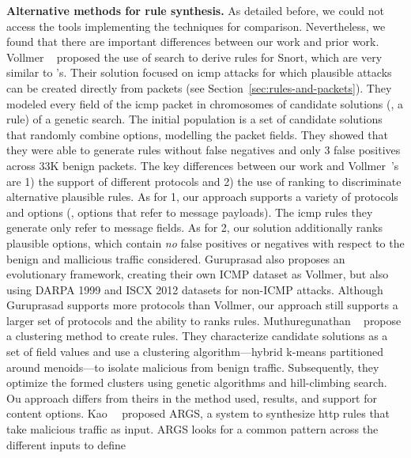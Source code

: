 \documentclass[conference]{IEEEtran}
\begin{document}
\noindent
\textbf{Alternative methods for rule synthesis.} As detailed before,
we could not access the tools implementing the techniques for
comparison. Nevertheless, we found that there are important
differences between our work and prior work. Vollmer
\etal{}~\cite{vollmer-etal-cics2011} proposed the use of search to
derive rules for Snort, which are very similar to \suri's.  Their
solution focused on icmp attacks for which plausible attacks can be
created directly from packets (see
Section~\ref{sec:rules-and-packets}). They modeled every field of the
icmp packet in chromosomes of candidate solutions (\ie{}, a rule) of a
genetic search. The initial population is a set of candidate solutions
that randomly combine options, modelling the packet fields. They
showed that they were able to generate rules without false negatives
and only 3 false positives across 33K benign packets. The key
differences between our work and Vollmer~\etal{}'s are 1) the support
of different protocols and 2) the use of ranking to discriminate
alternative plausible rules. As for 1, our approach supports a variety
of protocols and options (\eg{}, options that refer to message
payloads). The icmp rules they generate only refer to message fields.
 As for 2, our solution additionally ranks
plausible options, which contain \emph{no} false positives or
negatives with respect to the benign and mallicious traffic
considered. Guruprasad \etal{}\cite{guruprasad} also proposes an
evolutionary framework, creating their own ICMP dataset as Vollmer,
but also using DARPA 1999 \cite{darpa1999} and ISCX 2012 \cite{iscx}
datasets for non-ICMP attacks. Although Guruprasad supports more
protocols than Vollmer, our approach still supports a larger set of
protocols and the ability to ranks rules. Muthuregunathan
\etal{}~\cite{muthuregunathan-etal2009} propose a clustering method to
create rules. They characterize candidate solutions as a set of field
values and use a clustering algorithm---hybrid k-means partitioned
around menoids---to isolate malicious from benign
traffic. Subsequently, they optimize the formed clusters using genetic
algorithms and hill-climbing search. Ou approach differs from theirs
in the method used, results, and support for content
options. Kao~\etal~\cite{Kao2015AutomaticNR} proposed ARGS, a system
to synthesize http rules that take malicious traffic as input. ARGS
looks for a common pattern across the different inputs to define
\end{document}
